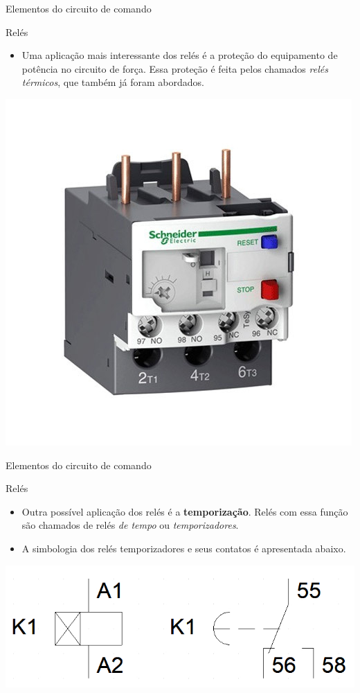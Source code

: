 \begin{frame}{Elementos do circuito de comando}
\begin{block}{Relés}
\begin{itemize}
    \item Uma aplicação mais interessante dos relés é a proteção do equipamento de potência no circuito de força. Essa proteção é feita pelos chamados \textit{relés térmicos}, que também já foram abordados.
\end{itemize}
\end{block}
\centerline{\includegraphics[width=0.5\linewidth]{Figuras/Ch06/fig12.jpg}}
\end{frame}


\begin{frame}{Elementos do circuito de comando}
\begin{block}{Relés}
\begin{itemize}
    \item Outra possível aplicação dos relés é a \textbf{temporização}. Relés com essa função são chamados de relés \textit{de tempo} ou \textit{temporizadores}.
    \item A simbologia dos relés temporizadores e seus contatos é apresentada abaixo.
\end{itemize}
\end{block}
\smallskip
\centerline{\includegraphics[width=0.8\linewidth]{Figuras/Ch06/fig13.jpg}}
\end{frame}


